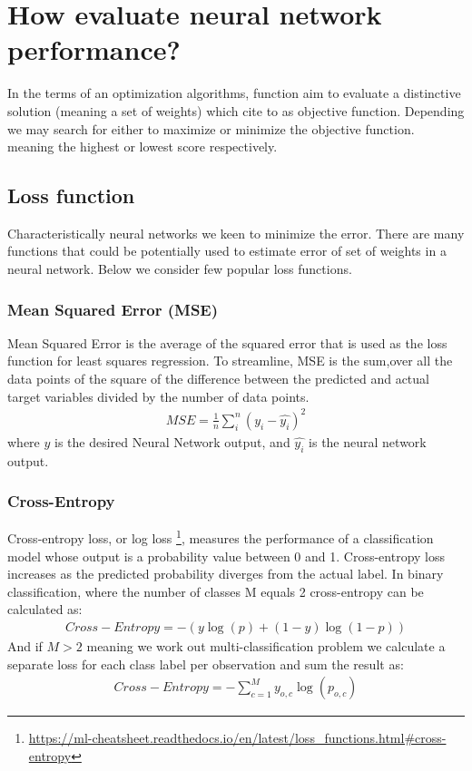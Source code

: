 \section{How evaluate neural network performance?}
In the terms of an optimization algorithms, function aim to evaluate a distinctive solution (meaning a set of weights) which cite to as objective function. Depending we may search for either to maximize or minimize the objective function. meaning the highest or lowest score respectively.
\subsection{Loss function}
Characteristically neural networks we keen to minimize the error. There are many functions that could be potentially used to estimate error of set of weights in a neural network. Below we consider few popular loss functions.

\subsubsection{Mean Squared Error (MSE)}
Mean Squared Error is the average of the squared error that is used as the loss function for least squares regression. To streamline, MSE is the sum,over all the data points of the square of the difference between the predicted and actual target variables divided by the number of data points.
\begin{align*}
MSE = \frac{{1}}{n} \sum_{i}^{n} (y_i - \widehat{y_i})^2
\end{align*}
where $y$ is the desired Neural Network output, and $\widehat{y_i}$ is the neural network output.

\subsubsection{Cross-Entropy}
Cross-entropy loss, or log loss \footnote{\url{https://ml-cheatsheet.readthedocs.io/en/latest/loss_functions.html#cross-entropy}}, measures the performance of a classification model whose output is a probability value between 0 and 1. Cross-entropy loss increases as the predicted probability diverges from the actual label.
In binary classification, where the number of classes M equals 2 cross-entropy can be calculated as:
\begin{align*}
Cross-Entropy = -{(y\log(p) + (1 - y)\log(1 - p))}
\end{align*}
And if $M > 2$ meaning we work out multi-classification problem we calculate a separate loss for each class label per observation and sum the result as:
\begin{align*}
Cross-Entropy = -\sum_{c=1}^My_{o,c}\log(p_{o,c})
\end{align*}


